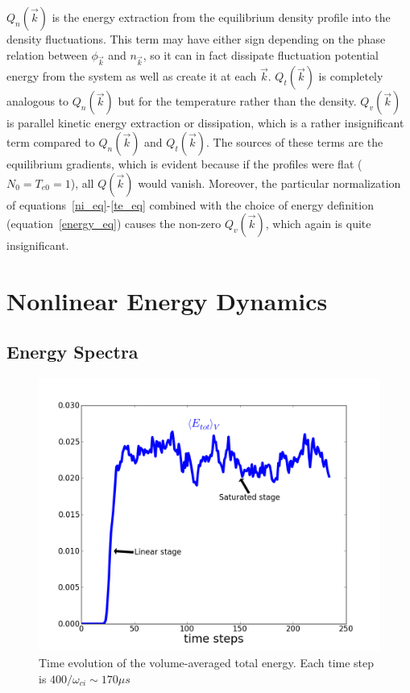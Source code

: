 \documentclass[showpacs,preprintnumbers,amsmath,amssymb,superscriptaddress,aip]{revtex4-1}
\begin{document}
$Q_n(\vec{k})$ is the energy extraction from the equilibrium density profile into the density fluctuations. 
This term may have either sign depending on the phase relation between $\phi_{\vec{k}}$ and $n_{\vec{k}}$, 
so it can in fact dissipate fluctuation potential energy from the system as well as create it
at each $\vec{k}$. $Q_t(\vec{k})$ is completely analogous to $Q_n(\vec{k})$ but for the temperature rather than the density. 
$Q_v(\vec{k})$ is parallel kinetic energy extraction or dissipation, which is a rather insignificant term compared to $Q_n(\vec{k})$ and $Q_t(\vec{k})$.
The sources of these terms are the equilibrium gradients, which is evident because if the profiles
were flat ($N_0=T_{e0}=1$), all $Q(\vec{k})$ would vanish.
Moreover, the particular normalization of equations~\ref{ni_eq}-\ref{te_eq} combined with the choice of energy definition (equation~\ref{energy_eq}) causes the non-zero $Q_v(\vec{k})$, which again
is quite insignificant.


\section{Nonlinear Energy Dynamics}
\label{nl_en_dynamics_sec}

\subsection{Energy Spectra}

\begin{figure}[!htbp]
\includegraphics[]{time_evolution}
\hfil
\caption{Time evolution of the volume-averaged total energy. Each time step is $400/\omega_{ci} \sim 170 \mu s$}
\label{time_evolution}
\end{figure}
\end{document}
